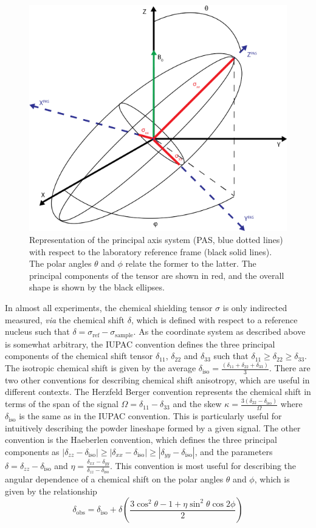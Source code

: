 \begin{refsection}
\begin{figure}
  \centering
  \includegraphics[width=0.4\linewidth]{Figures/Chemical_Shift_Tensor.png}
  \caption{Representation of the principal axis system (PAS, blue dotted lines) with respect to the laboratory reference frame (black solid lines). The polar angles $\theta$ and $\phi$ relate the former to the latter. The principal components of the tensor are shown in red, and the overall shape is shown by the black ellipses.}
  \label{fig:chemical-shielding-tensor}
\end{figure}

In almost all experiments, the chemical shielding tensor $\sigma$ is only indirected measured, \emph{via} the chemical shift $\delta$, which is defined with respect to a reference nucleus such that $\delta = \sigma_{\textrm{ref}} - \sigma_{\textrm{sample}}$.
As the coordinate system as described above is somewhat arbitrary, the IUPAC convention defines the three principal components of the chemical shift tensor $\delta_{11}$, $\delta_{22}$ and $\delta_{33}$ such that $\delta_{11} \geq \delta_{22} \geq \delta_{33}$.
The isotropic chemical shift is given by the average $\delta_{\textrm{iso}} = \frac{(\delta_{11} + \delta_{22} + \delta_{33})}{3}$.
There are two other conventions for describing chemical shift anisotropy, which are useful in different contexts.
The Herzfeld Berger convention represents the chemical shift in terms of the span of the signal $\Omega = \delta_{11} - \delta_{33}$ and the skew $\kappa = \frac{3(\delta_{22} - \delta_{\textrm{iso}})}{\Omega}$ where $\delta_{\textrm{iso}}$ is the same as in the IUPAC convention.
This is particularly useful for intuitively describing the powder lineshape formed by a given signal.
The other convention is the Haeberlen convention, which defines the three principal components as $|\delta_{zz} - \delta_{\textrm{iso}}| \geq |\delta_{xx} - \delta_{\textrm{iso}}| \geq |\delta_{yy} - \delta_{\textrm{iso}}|$, and the parameters $\delta = \delta_{zz} -\delta_{\textrm{iso}}$ and $\eta = \frac{\delta_{xx} - \delta_{yy}}{\delta_{zz} -\delta_{\textrm{iso}}}$.
This convention is most useful for describing the angular dependence of a chemical shift on the polar angles $\theta$ and $\phi$, which is given by the relationship\autocite{Haeberlen1976}
\begin{equation}
  \delta_{\textrm{obs}} = \delta_{\textrm{iso}} + \delta \left(\frac{3 \cos^2 \theta - 1 + \eta \sin^2 \theta \cos 2 \phi}{2} \right)
  \label{eqn:orientation-csa}
\end{equation}


\end{refsection}

